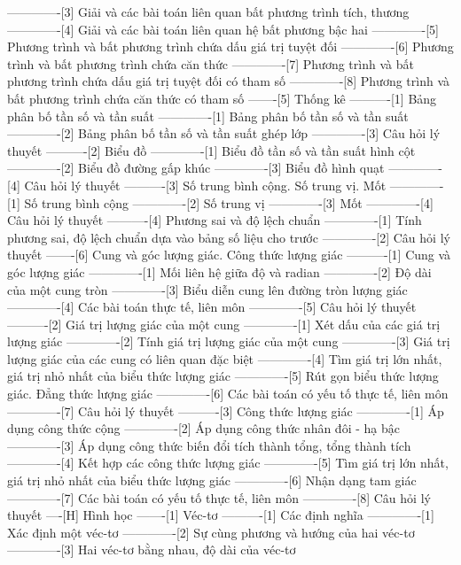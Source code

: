 -------------[3] Giải và các bài toán liên quan bất phương trình tích, thương
-------------[4] Giải và các bài toán liên quan hệ bất phương bậc hai
-------------[5] Phương trình và bất phương trình chứa dấu giá trị tuyệt đối
-------------[6] Phương trình và bất phương trình chứa căn thức
-------------[7] Phương trình và bất phương trình chứa dấu giá trị tuyệt đối có tham số
-------------[8] Phương trình và bất phương trình chứa căn thức có tham số
-------[5] Thống kê
----------[1] Bảng phân bố tần số và tần suất
-------------[1] Bảng phân bố tần số và tần suất
-------------[2] Bảng phân bố tần số và tần suất ghép lớp
-------------[3] Câu hỏi lý thuyết
----------[2] Biểu đồ
-------------[1] Biểu đồ tần số và tần suất hình cột
-------------[2] Biểu đồ đường gấp khúc
-------------[3] Biểu đồ hình quạt
-------------[4] Câu hỏi lý thuyết
----------[3] Số trung bình cộng. Số trung vị. Mốt
-------------[1] Số trung bình cộng
-------------[2] Số trung vị
-------------[3] Mốt
-------------[4] Câu hỏi lý thuyết
----------[4] Phương sai và độ lệch chuẩn
-------------[1] Tính phương sai, độ lệch chuẩn dựa vào bảng số liệu cho trước
-------------[2] Câu hỏi lý thuyết
-------[6] Cung và góc lượng giác. Công thức lượng giác
----------[1] Cung và góc lượng giác
-------------[1] Mối liên hệ giữa độ và radian
-------------[2] Độ dài của một cung tròn
-------------[3] Biểu diễn cung lên đường tròn lượng giác
-------------[4] Các bài toán thực tế, liên môn
-------------[5] Câu hỏi lý thuyết
----------[2] Giá trị lượng giác của một cung
-------------[1] Xét dấu của các giá trị lượng giác
-------------[2] Tính giá trị lượng giác của một cung
-------------[3] Giá trị lượng giác của các cung có liên quan đặc biệt
-------------[4] Tìm giá trị lớn nhất, giá trị nhỏ nhất của biểu thức lượng giác
-------------[5] Rút gọn biểu thức lượng giác. Đẳng thức lượng giác
-------------[6] Các bài toán có yếu tố thực tế, liên môn
-------------[7] Câu hỏi lý thuyết
----------[3] Công thức lượng giác
-------------[1] Áp dụng công thức cộng
-------------[2] Áp dụng công thức nhân đôi - hạ bậc
-------------[3] Áp dụng công thức biến đổi tích thành tổng, tổng thành tích
-------------[4] Kết hợp các công thức lượng giác
-------------[5] Tìm giá trị lớn nhất, giá trị nhỏ nhất của biểu thức lượng giác
-------------[6] Nhận dạng tam giác
-------------[7] Các bài toán có yếu tố thực tế, liên môn
-------------[8] Câu hỏi lý thuyết
----[H] Hình học
-------[1] Véc-tơ
----------[1] Các định nghĩa
-------------[1] Xác định một véc-tơ
-------------[2] Sự cùng phương và hướng của hai véc-tơ
-------------[3] Hai véc-tơ bằng nhau, độ dài của véc-tơ

